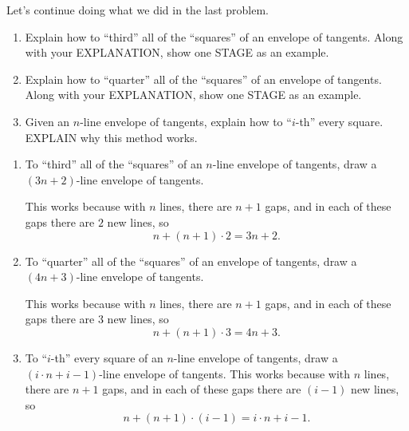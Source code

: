 \documentclass[noauthor,nooutcomes,12pt,hints,handout]{ximera}
\begin{document}
\begin{question}
  Let's continue doing what we did in the last problem.
  \begin{enumerate}
  \item Explain how to ``third'' all of the ``squares'' of an envelope
    of tangents. Along with your EXPLANATION, show one STAGE as an
    example.
  \item Explain how to ``quarter'' all of the ``squares'' of an
    envelope of tangents. Along with your EXPLANATION, show one STAGE
    as an example.
  \item Given an $n$-line envelope of tangents, explain how to
    ``$i$-th'' every square. EXPLAIN why this method works.
  \end{enumerate}
  \begin{freeResponse}
    \begin{enumerate}
    \item To ``third'' all of the ``squares'' of an $n$-line envelope
      of tangents, draw a $(3n+2)$-line envelope of tangents.
      \begin{center}
      \end{center}
      This works because with $n$ lines, there are $n+1$ gaps, and in
      each of these gaps there are $2$ new lines, so
      \[
      n + (n+1)\cdot 2  = 3n+2.
      \]
    \item To ``quarter'' all of the ``squares'' of an envelope of
      tangents, draw a $(4n+3)$-line envelope of tangents.
      \begin{center}
      \end{center}
      This works because with $n$ lines, there are $n+1$ gaps, and in
      each of these gaps there are $3$ new lines, so
      \[
      n + (n+1)\cdot 3  = 4n+3.
      \]
    \item To ``$i$-th'' every square of an $n$-line envelope of
      tangents, draw a $(i\cdot n+i-1)$-line envelope of
      tangents. This works because with $n$ lines, there are $n+1$
      gaps, and in each of these gaps there are $(i-1)$ new lines, so
      \[
      n + (n+1)\cdot (i-1)  = i\cdot n+i-1.
      \]
      
  \end{enumerate}
  \end{freeResponse}
\end{question}
\end{document}
